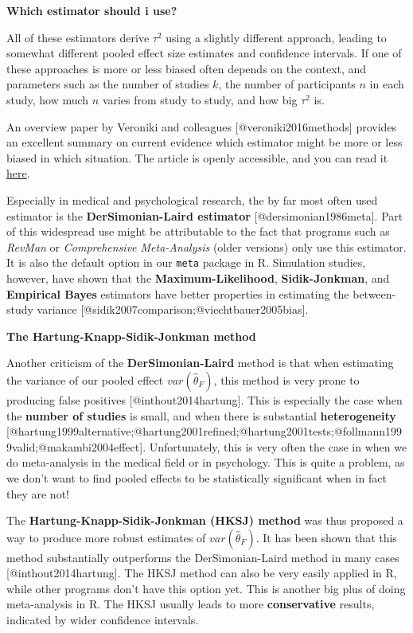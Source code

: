 \documentclass[]{book}
\begin{document}
\begin{rmdinfo}
\textbf{Which estimator should i use?}

All of these estimators derive \(\tau^{2}\) using a slightly different
approach, leading to somewhat different pooled effect size estimates and
confidence intervals. If one of these approaches is more or less biased
often depends on the context, and parameters such as the number of
studies \(k\), the number of participants \(n\) in each study, how much
\(n\) varies from study to study, and how big \(\tau^{2}\) is.

An overview paper by Veroniki and colleagues {[}@veroniki2016methods{]}
provides an excellent summary on current evidence which estimator might
be more or less biased in which situation. The article is openly
accessible, and you can read it
\href{https://www.ncbi.nlm.nih.gov/pmc/articles/PMC4950030/}{here}.

Especially in medical and psychological research, the by far most often
used estimator is the \textbf{DerSimonian-Laird estimator}
{[}@dersimonian1986meta{]}. Part of this widespread use might be
attributable to the fact that programs such as \emph{RevMan} or
\emph{Comprehensive Meta-Analysis} (older versions) only use this
estimator. It is also the default option in our \texttt{meta} package in
R. Simulation studies, however, have shown that the
\textbf{Maximum-Likelihood}, \textbf{Sidik-Jonkman}, and
\textbf{Empirical Bayes} estimators have better properties in estimating
the between-study variance
{[}@sidik2007comparison;@viechtbauer2005bias{]}.
\end{rmdinfo}

\begin{rmdinfo}
\textbf{The Hartung-Knapp-Sidik-Jonkman method}

Another criticism of the \textbf{DerSimonian-Laird} method is that when
estimating the variance of our pooled effect \(var(\hat\theta_F)\), this
method is very prone to producing false positives
{[}@inthout2014hartung{]}. This is especially the case when the
\textbf{number of studies} is small, and when there is substantial
\textbf{heterogeneity}
{[}@hartung1999alternative;@hartung2001refined;@hartung2001tests;@follmann1999valid;@makambi2004effect{]}.
Unfortunately, this is very often the case in when we do meta-analysis
in the medical field or in psychology. This is quite a problem, as we
don't want to find pooled effects to be statistically significant when
in fact they are not!

The \textbf{Hartung-Knapp-Sidik-Jonkman (HKSJ) method} was thus proposed
a way to produce more robust estimates of \(var(\hat\theta_F)\). It has
been shown that this method substantially outperforms the
DerSimonian-Laird method in many cases {[}@inthout2014hartung{]}. The
HKSJ method can also be very easily applied in R, while other programs
don't have this option yet. This is another big plus of doing
meta-analysis in R. The HKSJ usually leads to more \textbf{conservative}
results, indicated by wider confidence intervals.
\end{rmdinfo}
\end{document}
